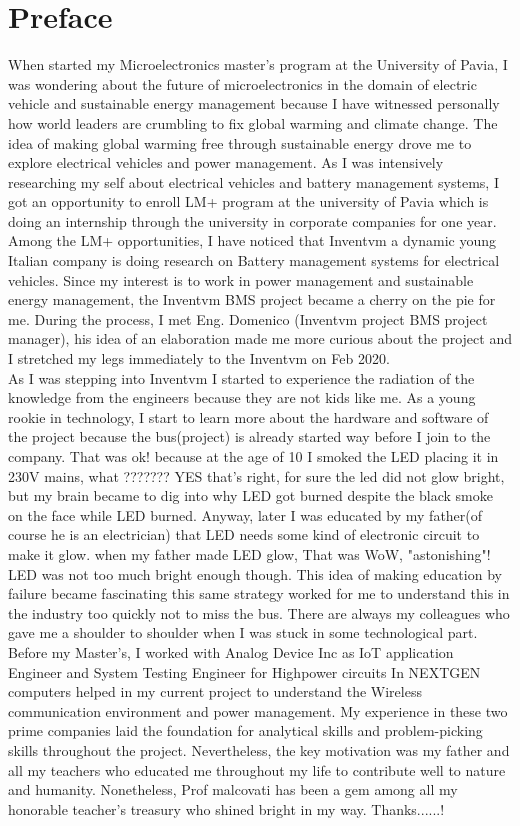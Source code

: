 \chapter{Preface}
When started my Microelectronics master's program at the University of Pavia, I was wondering about the future of microelectronics in the domain of electric vehicle and sustainable energy management because I have witnessed personally how world leaders are crumbling to fix global warming and climate change. The idea of making global warming free through sustainable energy drove me to explore electrical vehicles and power management. As I was intensively researching my self about electrical vehicles and battery management systems, I got an opportunity to enroll LM+ program at the university of Pavia which is doing an internship through the university in corporate companies for one year.\\
\indent Among the LM+ opportunities, I have noticed that Inventvm a dynamic young Italian company is doing research on Battery management systems for electrical vehicles. Since my interest is to work in power management and sustainable energy management, the Inventvm BMS project became a cherry on the pie for me. During the process, I met Eng. Domenico (Inventvm project BMS project manager), his idea of an elaboration made me more curious about the project and I stretched my legs immediately to the Inventvm on Feb 2020.\\
\indent As I was stepping into Inventvm I started to experience the radiation of the knowledge from the engineers because they are not kids like me. As a young rookie in technology, I start to learn more about the hardware and software of the project because the bus(project) is already started way before I join to the company. That was ok! because at the age of 10 I smoked the LED placing it in 230V mains, what ??????? YES that's right, for sure the led did not glow bright, but my brain became to dig into why LED got burned despite the black smoke on the face while LED burned. Anyway, later I was educated by my father(of course he is an electrician) that LED needs some kind of electronic circuit to make it glow. when my father made LED glow, That was WoW, "astonishing"! LED was not too much bright enough though. This idea of making education by failure became fascinating this same strategy worked for me to understand this in the industry too quickly not to miss the bus. There are always my colleagues who gave me a shoulder to shoulder when I was stuck in some technological part.\\
\indent Before my Master's, I worked with Analog Device Inc as IoT application Engineer and System Testing Engineer for Highpower circuits In NEXTGEN computers helped in my current project to understand the Wireless communication environment and power management. My experience in these two prime companies laid the foundation for analytical skills and problem-picking skills throughout the project. Nevertheless, the key motivation was my father and all my teachers who educated me throughout my life to contribute well to nature and humanity. Nonetheless, Prof malcovati has been a gem among all my honorable teacher's treasury who shined bright in my way. Thanks......!
